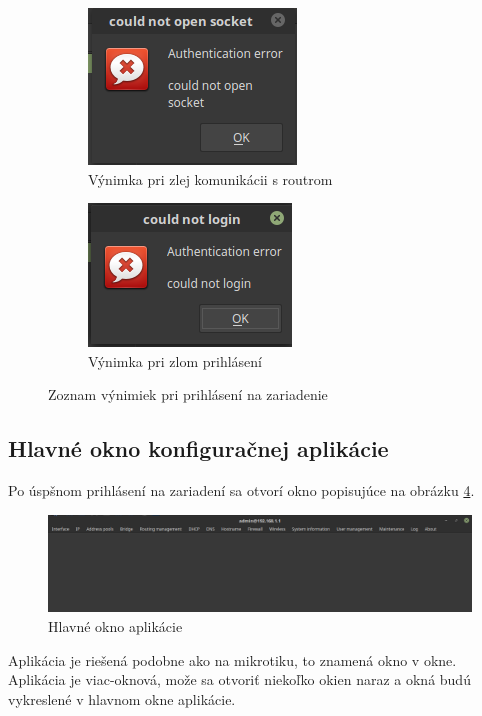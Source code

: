 \begin{figure}[h!]
\centering
\begin{subfigure}{.6\textwidth}
  \centering
  \includegraphics[width=.5\linewidth]{../text/socket.png}
  \caption{Výnimka pri zlej komunikácii s routrom}
  \label{fig:socket}
\end{subfigure}%
\begin{subfigure}{.6\textwidth}
  \centering
  \includegraphics[width=.5\linewidth]{../text/loginerror.png}
  \caption{Výnimka pri zlom prihlásení}
  \label{fig:loginworong}
\end{subfigure}
\caption{Zoznam výnimiek pri prihlásení na zariadenie}
\label{fig:exceptions}
\end{figure}
\subsection{Hlavné okno konfiguračnej aplikácie}
Po úspšnom prihlásení na zariadení sa otvorí okno popisujúce na obrázku \ref{fig:loginokno}.
\begin{figure}[H]
\centering
\includegraphics[scale=0.35]{../text/loginokno.png}
\caption{Hlavné okno aplikácie}
\label{fig:loginokno}
\end{figure}
Aplikácia je riešená podobne ako na mikrotiku, to znamená okno v okne. Aplikácia je viac-oknová, može sa otvoriť niekoľko okien naraz a okná budú vykreslené v hlavnom okne aplikácie. 
